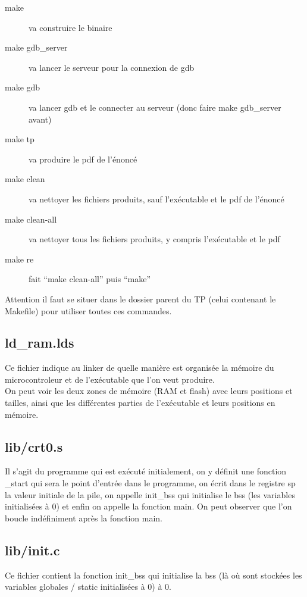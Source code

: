\documentclass[a4paper,10pt]{article} %
\begin{document}
\begin{description}
    \item[make] va construire le binaire
    \item[make gdb\_server] va lancer le serveur pour la connexion de gdb
    \item[make gdb] va lancer gdb et le connecter au serveur (donc faire make gdb\_server avant)
    \item[make tp] va produire le pdf de l'énoncé
    \item[make clean] va nettoyer les fichiers produits, sauf l’exécutable et le pdf de l'énoncé
    \item[make clean-all] va nettoyer tous les fichiers produits, y compris l’exécutable et le pdf
    \item[make re] fait ``make clean-all'' puis ``make''
\end{description}

Attention il faut se situer dans le dossier parent du TP (celui contenant le Makefile) pour utiliser toutes ces commandes.

\subsection{ld\_ram.lds}
Ce fichier indique au linker de quelle manière est organisée la mémoire du microcontroleur et de l’exécutable que l'on veut produire.\\

On peut voir les deux zones de mémoire (RAM et flash) avec leurs positions et tailles, ainsi que les différentes parties de l’exécutable et leurs positions en mémoire.

\subsection{lib/crt0.s}
Il s'agit du programme qui est exécuté initialement, on y définit une fonction \_start qui sera le point d'entrée dans le programme, on écrit dans le registre sp la valeur initiale de la pile, on appelle init\_bss qui initialise le bss (les variables initialisées à 0) et enfin on appelle la fonction main. On peut observer que l'on boucle indéfiniment après la fonction main.

\subsection{lib/init.c}
Ce fichier contient la fonction init\_bss qui initialise la bss (là où sont stockées les variables globales / static initialisées à 0) à 0.
\end{document}

